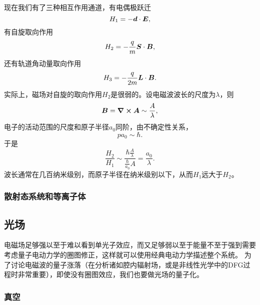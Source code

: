 现在我们有了三种相互作用通道，有电偶极跃迁
\begin{equation}
    H_1 = - \vb*{d} \cdot \vb*{E},
\end{equation}
有自旋取向作用
\begin{equation}
    H_2 = - \frac{q}{m} \vb*{S} \cdot \vb*{B},
\end{equation}
还有轨道角动量取向作用
\begin{equation}
    H_3 = - \frac{q}{2m} \vb*{L} \cdot \vb*{B}.
\end{equation}
实际上，磁场对自旋的取向作用${H}_2$是很弱的。设电磁波波长的尺度为$\lambda$，则
\[
    \vb*{B} = \curl{\vb*{A}} \sim \frac{A}{\lambda},
\]
电子的活动范围的尺度和原子半径$a_0$同阶，由不确定性关系，
\[
    p a_0 \sim \hbar.
\]
于是
\[
    \frac{H_2}{H_1} \sim \frac{\hbar \frac{A}{\lambda}}{\frac{\hbar}{a_0} A} = \frac{a_0}{\lambda}.
\]
波长通常在几百纳米级别，而原子半径在纳米级别以下，从而${H}_1$远大于${H}_2$。

\subsubsection{散射态系统和等离子体}

\subsection{光场}

电磁场足够强以至于难以看到单光子效应，而又足够弱以至于能量不至于强到需要考虑量子电动力学的圈图修正，这样就可以使用经典电动力学描述整个系统。
为了讨论电磁波的量子涨落（在分析诸如腔内辐射场，或是非线性光学中的DFG过程时非常重要），即使没有圈图效应，我们也要做光场的量子化。

\subsubsection{真空}

